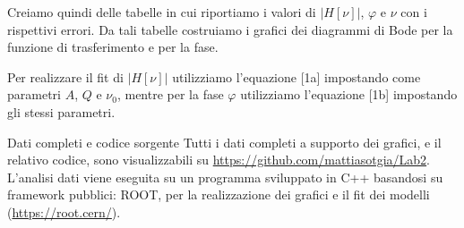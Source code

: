 \documentclass[
    rmp,
    reprint, 
    superscriptaddress, 
    altaffilletter, 
    amsmath, 
    amssymb, 
    a4paper]{revtex4-2}
\begin{document}
Creiamo quindi delle tabelle in cui riportiamo i valori di $\big|H[\nu]\big|$, $\varphi$ e $\nu$ con i rispettivi errori. Da tali tabelle costruiamo i grafici dei diagrammi di Bode per la funzione di trasferimento e per la fase. 

Per realizzare il fit di $\big|H[\nu]\big|$ utilizziamo l'equazione [1a] impostando come parametri $A$, $Q$ e $\nu_{0}$, mentre per la fase $\varphi$ utilizziamo l'equazione [1b] impostando gli stessi parametri.  







    \begin{methods}{D\lowercase{ati completi e codice sorgente}}
        Tutti i dati completi a supporto dei grafici, e il relativo codice, sono visualizzabili su \url{https://github.com/mattiasotgia/Lab2}. L'analisi dati viene eseguita su un programma sviluppato in C++ basandosi su framework pubblici: ROOT, per la realizzazione dei grafici e il fit dei modelli (\url{https://root.cern/}).
    \end{methods}


\appendix

\setcounter{table}{0}
\renewcommand{\thetable}{S-\arabic{table}}

\end{document}
